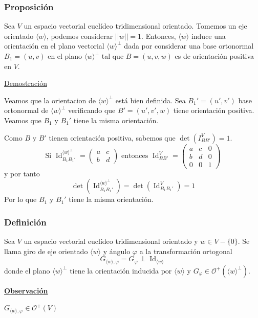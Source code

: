 \documentclass[12pt, a4paper, ones, notitlepage, openany,titlepage]{article}
\newcommand{\demostracion}{\noindent\underline{Demostración}}
\newcommand{\observacion}{\noindent\underline{\textbf{Observación}}}
\begin{document}
\subsubsection{Proposición}
Sea $V$ un espacio vectorial euclídeo tridimensional orientado. Tomemos un eje orientado $\langle w \rangle$, podemos considerar $||w|| = 1$. Entonces, $\langle w \rangle$ induce una orientación en el plano vectorial $\langle w \rangle^\perp$ dada por considerar una base ortonormal $B_1 = (u,v)$ en el plano $\langle w \rangle^\perp$ tal que $B = (u,v,w)$ es de orientación positiva en $V$.

\demostracion

Veamos que la orientacion de $\langle w \rangle^\perp$ está bien definida. Sea $B_1' = (u',v')$ base ortonormal de $\langle w \rangle^\perp$ verificando que $B' = (u',v',w)$ tiene orientación positiva. Veamos que $B_1$ y $B_1'$ tiene la misma orientación.

Como $B$ y $B'$ tienen orientación positiva, sabemos que $\det(I_{BB'}^V) = 1$.
$$
\text{Si }\operatorname{Id}_{B_1 B_1'}^{\langle w \rangle^\perp} = \begin{pmatrix}
	a & c \\
	b & d
\end{pmatrix} \text{ entonces } \operatorname{Id}_{BB'}^V = \begin{pmatrix}
	a & c & 0 \\
	b & d & 0 \\
	0 & 0 & 1
\end{pmatrix}
$$
y por tanto
$$
\operatorname{det}\left(\operatorname{Id}_{B_1 B_1'}^{\langle w \rangle^\perp}\right) = \operatorname{det}\left(\operatorname{Id}_{B_1 B_1'}^V\right) = 1
$$ 
Por lo que $B_1$ y $B_1'$ tiene la misma orientación.

\subsubsection{Definición}
Sea $V$ un espacio vectorial euclídeo tridimensional orientado y $w \in V - \{0\}$. Se llama giro de eje orientado $\langle w \rangle$ y ángulo $\varphi$ a la transformación ortogonal
$$
G_{\langle w \rangle, \varphi} = G_\varphi \perp \operatorname{Id}_{\langle w \rangle}
$$
donde el plano $\langle w \rangle^\perp$ tiene la orientación inducida por $\langle w \rangle$ y $G_\varphi \in \mathcal{O}^+ (\langle w \rangle^\perp)$.

\observacion

$G_{\langle w \rangle, \varphi} \in \mathcal{O}^+(V)$
\end{document}
